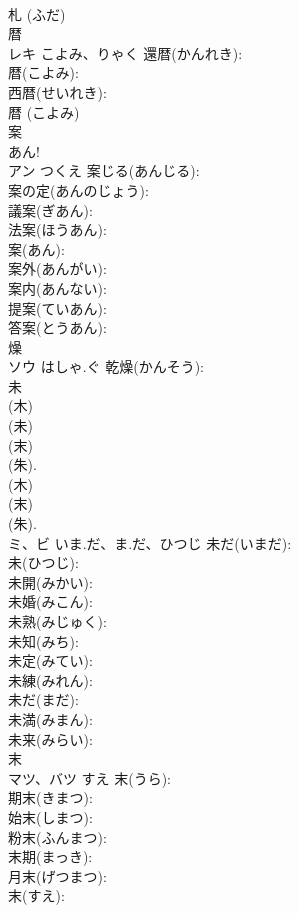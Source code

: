\documentclass[8pt]{extreport}
\begin{document}
\begin{CJK}{UTF8}{min}
\\	札 (ふだ)
\\	暦			
\\	レキ	こよみ、りゃく	還暦(かんれき): 
\\	暦(こよみ): 
\\	西暦(せいれき): 
\\	暦 (こよみ)
\\	案			
\\	あん!	
\\	アン	つくえ	案じる(あんじる): 
\\	案の定(あんのじょう): 
\\	議案(ぎあん): 
\\	法案(ほうあん): 
\\	案(あん): 
\\	案外(あんがい): 
\\	案内(あんない): 
\\	提案(ていあん): 
\\	答案(とうあん): 
\\	燥			
\\	ソウ	はしゃ.ぐ	乾燥(かんそう): 
\\	未			
\\	(木) 
\\	(未) 
\\	(末) 
\\	(朱).	
\\	(木) 
\\	(末) 
\\	(朱).	
\\	ミ、ビ	いま.だ、ま.だ、ひつじ	未だ(いまだ): 
\\	未(ひつじ): 
\\	未開(みかい): 
\\	未婚(みこん): 
\\	未熟(みじゅく): 
\\	未知(みち): 
\\	未定(みてい): 
\\	未練(みれん): 
\\	未だ(まだ): 
\\	未満(みまん): 
\\	未来(みらい): 
\\	末			
\\	マツ、バツ	すえ	末(うら): 
\\	期末(きまつ): 
\\	始末(しまつ): 
\\	粉末(ふんまつ): 
\\	末期(まっき): 
\\	月末(げつまつ): 
\\	末(すえ): 

\end{CJK}
\end{document}
